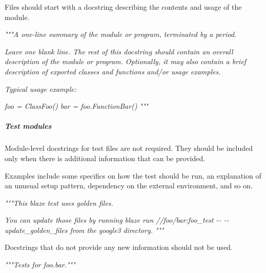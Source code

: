 \documentclass[
]{article}
\newenvironment{Shaded}{}{}
\newcommand{\CommentTok}[1]{\textcolor[rgb]{0.38,0.63,0.69}{\textit{#1}}}
\begin{document}
Files should start with a docstring describing the contents and usage of
the module.

\begin{samepage}
\begin{Shaded}
\begin{Highlighting}[]
\CommentTok{"""A one{-}line summary of the module or program, terminated by a period.}

\CommentTok{Leave one blank line.  The rest of this docstring should contain an}
\CommentTok{overall description of the module or program.  Optionally, it may also}
\CommentTok{contain a brief description of exported classes and functions and/or usage}
\CommentTok{examples.}

\CommentTok{Typical usage example:}

\CommentTok{  foo = ClassFoo()}
\CommentTok{  bar = foo.FunctionBar()}
\CommentTok{"""}
\end{Highlighting}
\end{Shaded}
\end{samepage}

\subparagraph{Test modules}

Module-level docstrings for test files are not required. They should be
included only when there is additional information that can be provided.

Examples include some specifics on how the test should be run, an
explanation of an unusual setup pattern, dependency on the external
environment, and so on.

\begin{samepage}
\begin{Shaded}
\begin{Highlighting}[]
\CommentTok{"""This blaze test uses golden files.}

\CommentTok{You can update those files by running}
\CommentTok{\textasciigrave{}blaze run //foo/bar:foo\_test {-}{-} {-}{-}update\_golden\_files\textasciigrave{} from the \textasciigrave{}google3\textasciigrave{}}
\CommentTok{directory.}
\CommentTok{"""}
\end{Highlighting}
\end{Shaded}
\end{samepage}

Docstrings that do not provide any new information should not be used.

\begin{samepage}
\begin{Shaded}
\begin{Highlighting}[]
\CommentTok{"""Tests for foo.bar."""}
\end{Highlighting}
\end{Shaded}
\end{samepage}
\end{document}
